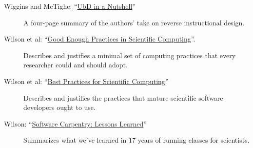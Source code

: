 \begin{description}
\item[Wiggins and McTighe:
``\href{\{\{\%20page.root\%20\}\}/files/papers/wiggins-mctighe-ubd-nutshell.pdf}{UbD
in a Nutshell}'']
A four-page summary of the authors' take on reverse instructional
design.
\item[Wilson et al: ``\href{https://arxiv.org/abs/1609.00037}{Good
Enough Practices in Scientific Computing}''.]
Describes and justifies a minimal set of computing practices that every
researcher could and should adopt.
\item[Wilson et al:
``\href{http://www.plosbiology.org/article/info\%3Adoi\%2F10.1371\%2Fjournal.pbio.1001745}{Best
Practices for Scientific Computing}'']
Describes and justifies the practices that mature scientific software
developers ought to use.
\item[Wilson:
``\href{http://f1000research.com/articles/3-62/v2}{Software Carpentry:
Lessons Learned}'']
Summarizes what we've learned in 17 years of running classes for
scientists.
\end{description}
